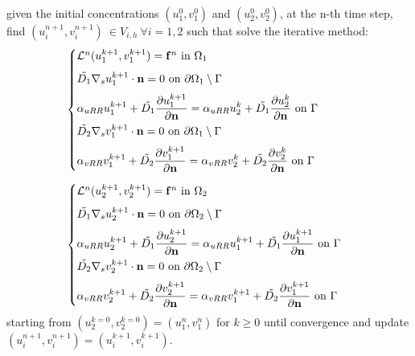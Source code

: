 given the initial concentrations $(u_1^0, v_1^0)$ and $(u_2^0, v_2^0)$, at the n-th time step, find $(u_i^{n+1}, v_i^{n+1}) \ \in V_{i,h} \ \forall i = 1,2$ such that solve the iterative method:
\begin{equation} \label{eq:RR}
\begin{aligned}
& \begin{cases}
\mathcal{L}^n (u_1^{k+1}, v_1^{k+1}) = \mathbf{f}^n \ \text{in} \ \Omega_1 \\[6pt]
\Tilde{D_1} \nabla_s u_1^{k+1} \cdot \mathbf{n} = 0 \ \text{on} \ \partial \Omega_1 \setminus \Gamma \\[6pt]
\alpha_{uRR} u_1^{k+1} +\Tilde{D_1} \displaystyle{\partial u_1^{k+1} \over \partial \mathbf{n}} = \alpha_{uRR} u_2^{k} +\Tilde{D_1}\displaystyle{\partial u_2^{k}\over\partial \mathbf{n}}  \ \text{on} \ \Gamma \\[6pt]
\Tilde{D_2} \nabla_s v_1^{k+1} \cdot \mathbf{n} = 0 \ \text{on} \ \partial \Omega_1 \setminus \Gamma\\[6pt]
\alpha_{vRR} v_1^{k+1} +\Tilde{D_2} \displaystyle{\partial v_1^{k+1}\over\partial \mathbf{n}} = \alpha_{vRR} v_2^{k} +\Tilde{D_2} \displaystyle{\partial v_2^{k}\over\partial \mathbf{n}}  \ \text{on} \ \Gamma
\end{cases}
\\[6pt]
& \begin{cases}
\mathcal{L}^n (u_2^{k+1}, v_2^{k+1}) = \mathbf{f}^n \ \text{in} \ \Omega_2 \\[6pt]
\Tilde{D_1} \nabla_s u_2^{k+1} \cdot \mathbf{n} = 0 \ \text{on} \ \partial \Omega_2 \setminus \Gamma \\[6pt]
\alpha_{uRR} u_2^{k+1} + \Tilde{D_1} \displaystyle{\partial u_2^{k+1}\over\partial \mathbf{n}} = \alpha_{uRR} u_1^{k+1} + \Tilde{D_1} \displaystyle{\partial u_1^{k+1}\over\partial \mathbf{n}}  \ \text{on} \ \Gamma \\[6pt]
\Tilde{D_2} \nabla_s v_2^{k+1} \cdot \mathbf{n} = 0 \ \text{on} \ \partial \Omega_2 \setminus \Gamma\\[6pt]
\alpha_{vRR} v_2^{k+1} + \Tilde{D_2} \displaystyle{\partial v_2^{k+1}\over\partial \mathbf{n}} = \alpha_{vRR} v_1^{k+1} + \Tilde{D_2} \displaystyle{\partial v_1^{k+1}\over\partial \mathbf{n}}  \ \text{on} \ \Gamma
\end{cases}
\end{aligned}\end{equation}
starting from $(u_2^{k = 0}, v_2^{k = 0}) = (u_1^n, v_1^n)$  for $k \geq 0$ until convergence and update $(u_i^{n+1}, v_i^{n+1}) = (u_i^{k+1}, v_i^{k+1})$.

